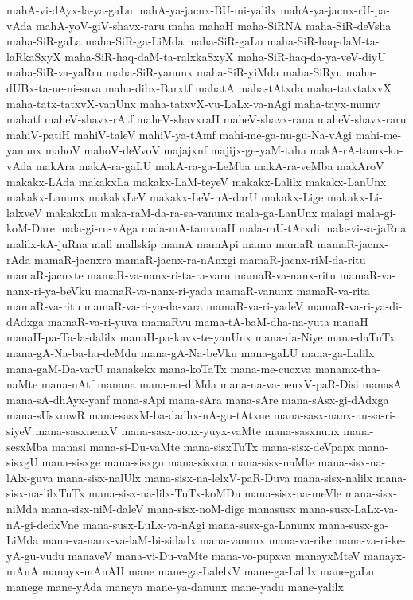 {mahA-vi-dAyx-la-ya-gaLu
mahA-ya-jacnx-BU-mi-yalilx
mahA-ya-jacnx-rU-pa-vAda
mahA-yoV-giV-shavx-raru
maha
mahaH
maha-SiRNA
maha-SiR-deVsha
maha-SiR-gaLa
maha-SiR-ga-LiMda
maha-SiR-gaLu
maha-SiR-haq-daM-ta-laRkaSxyX
maha-SiR-haq-daM-ta-ralxkaSxyX
maha-SiR-haq-da-ya-veV-diyU
maha-SiR-va-yaRru
maha-SiR-yanunx
maha-SiR-yiMda
maha-SiRyu
maha-dUBx-ta-ne-ni-suva
maha-dibx-Barxtf
mahatA
maha-tAtxda
maha-tatxtatxvX
maha-tatx-tatxvX-vanUnx
maha-tatxvX-vu-LaLx-va-nAgi
maha-tayx-mumv
mahatf
maheV-shavx-rAtf
maheV-shavxraH
maheV-shavx-rana
maheV-shavx-raru
mahiV-patiH
mahiV-taleV
mahiV-ya-tAmf
mahi-me-ga-nu-gu-Na-vAgi
mahi-me-yanunx
mahoV
mahoV-deVvoV
majajxnf
majijx-ge-yaM-taha
makA-rA-tamx-ka-vAda
makAra
makA-ra-gaLU
makA-ra-ga-LeMba
makA-ra-veMba
makAroV
makakx-LAda
makakxLa
makakx-LaM-teyeV
makakx-Lalilx
makakx-LanUnx
makakx-Lanunx
makakxLeV
makakx-LeV-nA-darU
makakx-Lige
makakx-Li-lalxveV
makakxLu
maka-raM-da-ra-sa-vanunx
mala-ga-LanUnx
malagi
mala-gi-koM-Dare
mala-gi-ru-vAga
mala-mA-tamxnaH
mala-mU-tArxdi
mala-vi-sa-jaRna
malilx-kA-juRna
mall
mallskip
mamA
mamApi
mama
mamaR
mamaR-jacnx-rAda
mamaR-jacnxra
mamaR-jacnx-ra-nAnxgi
mamaR-jacnx-riM-da-ritu
mamaR-jacnxte
mamaR-va-nanx-ri-ta-ra-varu
mamaR-va-nanx-ritu
mamaR-va-nanx-ri-ya-beVku
mamaR-va-nanx-ri-yada
mamaR-vanunx
mamaR-va-rita
mamaR-va-ritu
mamaR-va-ri-ya-da-vara
mamaR-va-ri-yadeV
mamaR-va-ri-ya-di-dAdxga
mamaR-va-ri-yuva
mamaRvu
mama-tA-baM-dha-na-yuta
manaH
manaH-pa-Ta-la-dalilx
manaH-pa-kavx-te-yanUnx
mana-da-Niye
mana-daTuTx
mana-gA-Na-ba-hu-deMdu
mana-gA-Na-beVku
mana-gaLU
mana-ga-Lalilx
mana-gaM-Da-varU
manakekx
mana-koTaTx
mana-me-cucxva
manamx-tha-naMte
mana-nAtf
manana
mana-na-diMda
mana-na-va-nenxV-paR-Disi
manasA
mana-sA-dhAyx-yanf
mana-sApi
mana-sAra
mana-sAre
mana-sAsx-gi-dAdxga
mana-sUsxmwR
mana-sasxM-ba-dadhx-nA-gu-tAtxne
mana-sasx-nanx-nu-sa-ri-siyeV
mana-sasxnenxV
mana-sasx-nonx-yuyx-vaMte
mana-sasxnunx
mana-sesxMba
manasi
mana-si-Du-vaMte
mana-sisxTuTx
mana-sisx-deVpapx
mana-sisxgU
mana-sisxge
mana-sisxgu
mana-sisxna
mana-sisx-naMte
mana-sisx-na-lAlx-guva
mana-sisx-nalUlx
mana-sisx-na-lelxV-paR-Duva
mana-sisx-nalilx
mana-sisx-na-lilxTuTx
mana-sisx-na-lilx-TuTx-koMDu
mana-sisx-na-meVle
mana-sisx-niMda
mana-sisx-niM-daleV
mana-sisx-noM-dige
manasusx
mana-susx-LaLx-va-nA-gi-dedxVne
mana-susx-LuLx-va-nAgi
mana-susx-ga-Lanunx
mana-susx-ga-LiMda
mana-va-nanx-va-laM-bi-sidadx
mana-vanunx
mana-va-rike
mana-va-ri-ke-yA-gu-vudu
manaveV
mana-vi-Du-vaMte
mana-vo-pupxva
manayxMteV
manayx-mAnA
manayx-mAnAH
mane
mane-ga-LalelxV
mane-ga-Lalilx
mane-gaLu
manege
mane-yAda
maneya
mane-ya-danunx
mane-yadu
mane-yalilx
}

